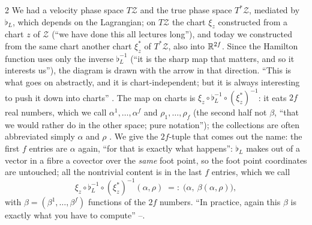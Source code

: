 \begin{paracol}{2}
We had a velocity phase space $T\mathcal Z$ and the true phase space $T^*\mathcal Z$, mediated by $\flat_L$, which depends on the Lagrangian; on $T\mathcal Z$ the chart $\xi_z$ constructed from a chart $z$ of $\mathcal Z$ (``we have done this all lectures long''), and today we constructed from the same chart another chart $\xi^*_z$ of $T^*\mathcal Z$, also into $\mathbb{R}^{2f}$. Since the Hamilton function uses only the inverse $\flat_L^{-1}$ (``it is the sharp map that matters, and so it interests us''), the diagram is drawn with the arrow in that direction. ``This is what goes on abstractly, and it is chart-independent; but it is always interesting to push it down into charts'' . The map on charts is $\xi_z\circ\flat_L^{-1}\circ(\xi^*_z)^{-1}$: it eats $2f$ real numbers, which we call $\alpha^1,\dots,\alpha^f$ and $\rho_1,\dots,\rho_f$ (the second half not $\beta$, ``that we would rather do in the other space; pure notation''); the collections are often abbreviated simply $\alpha$ and $\rho$ . We give the $2f$-tuple that comes out the name: the first $f$ entries are $\alpha$ again, ``for that is exactly what happens'': $\flat_L$ makes out of a vector in a fibre a covector over the \emph{same} foot point, so the foot point coordinates are untouched; all the nontrivial content is in the last $f$ entries, which we call
\begin{equation}\label{eq:hq-beta}
  \xi_z\circ\flat_L^{-1}\circ(\xi^*_z)^{-1}(\alpha,\rho)\;=:\;\bigl(\alpha,\ \beta(\alpha,\rho)\bigr),
\end{equation}
with $\beta=(\beta^1,\dots,\beta^f)$ functions of the $2f$ numbers. ``In practice, again this $\beta$ is exactly what you have to compute'' --.


\end{paracol}
